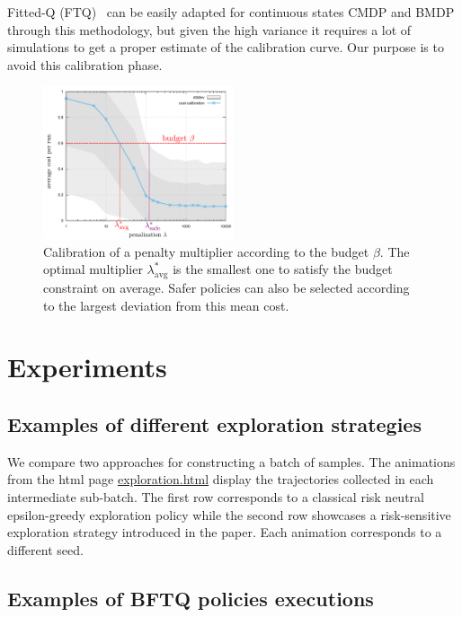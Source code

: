 Fitted-Q (FTQ)~\citep{Ernst2005,Riedmiller2005} can be easily adapted for continuous states CMDP and BMDP through this methodology, but given the high variance it requires a lot of simulations to get a proper estimate of the calibration curve. Our purpose is to avoid this calibration phase.

\begin{figure}[tp]
    \centering
    \includegraphics[width=0.5\textwidth]{source/img/CalibrationExample}
    \caption{Calibration of a penalty multiplier according to the budget $\beta$. The optimal multiplier $\lambda^*_{\text{avg}}$ is the smallest one to satisfy the budget constraint on average. Safer policies can also be selected according to the largest deviation from this mean cost.}
    \label{fig:Lagrangian}
\end{figure}


\section{Experiments}
\label{sec:exp-supp}


\subsection{Examples of different exploration strategies}
\label{subsec:exploration-examples}
We compare two approaches for constructing a batch of samples. The animations from the html page \url{exploration.html} display the trajectories collected in each intermediate sub-batch. The first row corresponds to a classical  risk neutral epsilon-greedy exploration policy while the second row showcases a risk-sensitive exploration strategy introduced in the paper. Each animation corresponds to a different seed.

\subsection{Examples of BFTQ policies executions}
\label{sec:bftq-executions}

